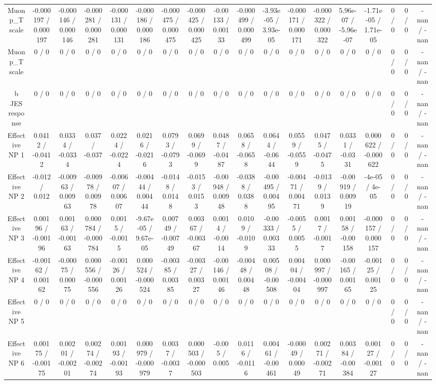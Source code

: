 \documentclass[10pt]{article}
\begin{document}
\begin{table}[htbp]
\begin{center}
\begin{tabular}{|c|c|c|c|c|c|c|c|c|c|c|c|c|c|c|c|c|c|}
  Muon p_{T} scale & -0.000197 / 0.000197 & -0.000146 / 0.000146 & -0.000281 / 0.000281 & -0.000131 / 0.000131 & -0.000186 / 0.000186 & -0.000475 / 0.000475 & -0.000425 / 0.000425 & -0.00133 / 0.00133 & -0.000499 / 0.000499 & -3.93e-05 / 3.93e-05 & -0.000171 / 0.000171 & -0.000322 / 0.000322 & 5.96e-07 / -5.96e-07 & -1.71e-05 / 1.71e-05 & 0 / 0 & 0 / 0 & -nan / -nan \\ 
  Muon p_{T} scale & 0 / 0 & 0 / 0 & 0 / 0 & 0 / 0 & 0 / 0 & 0 / 0 & 0 / 0 & 0 / 0 & 0 / 0 & 0 / 0 & 0 / 0 & 0 / 0 & 0 / 0 & 0 / 0 & 0 / 0 & 0 / 0 & -nan / -nan \\ 
  b JES response & 0 / 0 & 0 / 0 & 0 / 0 & 0 / 0 & 0 / 0 & 0 / 0 & 0 / 0 & 0 / 0 & 0 / 0 & 0 / 0 & 0 / 0 & 0 / 0 & 0 / 0 & 0 / 0 & 0 / 0 & 0 / 0 & -nan / -nan \\ 
  Effective NP 1 & 0.0412 / -0.0412 & 0.0334 / -0.0334 & 0.037 / -0.037 & 0.0224 / -0.0224 & 0.0216 / -0.0216 & 0.0793 / -0.0793 & 0.0699 / -0.0699 & 0.0487 / -0.0487 & 0.0658 / -0.0658 & 0.0644 / -0.0644 & 0.0559 / -0.0559 & 0.0475 / -0.0475 & 0.0331 / -0.0331 & 0.000622 / -0.000622 & 0 / 0 & 0 / 0 & -nan / -nan \\ 
  Effective NP 2 & -0.012 / 0.012 & -0.00963 / 0.00963 & -0.00978 / 0.00978 & -0.00607 / 0.00607 & -0.00444 / 0.00444 & -0.0148 / 0.0148 & -0.0153 / 0.0153 & -0.00948 / 0.00948 & -0.0388 / 0.0388 & -0.00495 / 0.00495 & -0.00471 / 0.00471 & -0.0139 / 0.0139 & -0.00919 / 0.00919 & -4e-05 / 4e-05 & 0 / 0 & 0 / 0 & -nan / -nan \\ 
  Effective NP 3 & 0.00196 / -0.00196 & 0.00163 / -0.00163 & 0.000784 / -0.000784 & 0.0015 / -0.0015 & -9.67e-05 / 9.67e-05 & 0.00749 / -0.00749 & 0.00367 / -0.00367 & 0.0014 / -0.0014 & 0.0109 / -0.0109 & -0.00333 / 0.00333 & -0.0055 / 0.0055 & 0.0017 / -0.0017 & 0.00158 / -0.00158 & -0.000157 / 0.000157 & 0 / 0 & 0 / 0 & -nan / -nan \\ 
  Effective NP 4 & -0.00162 / 0.00162 & -0.00075 / 0.00075 & 0.000556 / -0.000556 & -0.00126 / 0.00126 & 0.000524 / -0.000524 & -0.00385 / 0.00385 & -0.00327 / 0.00327 & -0.00146 / 0.00146 & -0.00448 / 0.00448 & 0.00508 / -0.00508 & 0.00404 / -0.00404 & 0.000997 / -0.000997 & -0.00165 / 0.00165 & -0.00125 / 0.00125 & 0 / 0 & 0 / 0 & -nan / -nan \\ 
  Effective NP 5 & 0 / 0 & 0 / 0 & 0 / 0 & 0 / 0 & 0 / 0 & 0 / 0 & 0 / 0 & 0 / 0 & 0 / 0 & 0 / 0 & 0 / 0 & 0 / 0 & 0 / 0 & 0 / 0 & 0 / 0 & 0 / 0 & -nan / -nan \\ 
  Effective NP 6 & 0.00175 / -0.00175 & 0.00201 / -0.00201 & 0.00274 / -0.00274 & 0.00193 / -0.00193 & 0.000979 / -0.000979 & 0.0037 / -0.0037 & 0.000503 / -0.000503 & -0.005 / 0.005 & 0.0116 / -0.0116 & 0.00461 / -0.00461 & -0.00049 / 0.00049 & 0.00271 / -0.00271 & 0.00384 / -0.00384 & 0.00127 / -0.00127 & 0 / 0 & 0 / 0 & -nan / -nan \\ 

\end{tabular}
\end{center}
\end{table}
\end{document}

